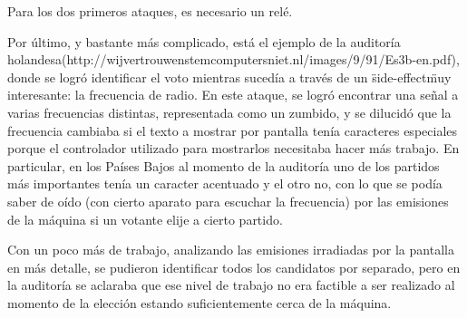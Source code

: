 Para los dos primeros ataques, es necesario un relé.

Por último, y bastante más complicado, está el ejemplo de la auditoría holandesa(http://wijvertrouwenstemcomputersniet.nl/images/9/91/Es3b-en.pdf), donde se logró identificar el voto mientras sucedía a través de un \"side-effect\" muy interesante: la frecuencia de radio. En este ataque, se logró encontrar una señal a varias frecuencias distintas, representada como un zumbido, y se dilucidó que la frecuencia cambiaba si el texto a mostrar por pantalla tenía caracteres especiales porque el controlador utilizado para mostrarlos necesitaba hacer más trabajo. En particular, en los Países Bajos al momento de la auditoría uno de los partidos más importantes tenía un caracter acentuado y el otro no, con lo que se podía saber de oído (con cierto aparato para escuchar la frecuencia) por las emisiones de la máquina si un votante elije a cierto partido.

Con un poco más de trabajo, analizando las emisiones irradiadas por la pantalla en más detalle, se pudieron identificar todos los candidatos por separado, pero en la auditoría se aclaraba que ese nivel de trabajo no era factible a ser realizado al momento de la elección estando suficientemente cerca de la máquina.
